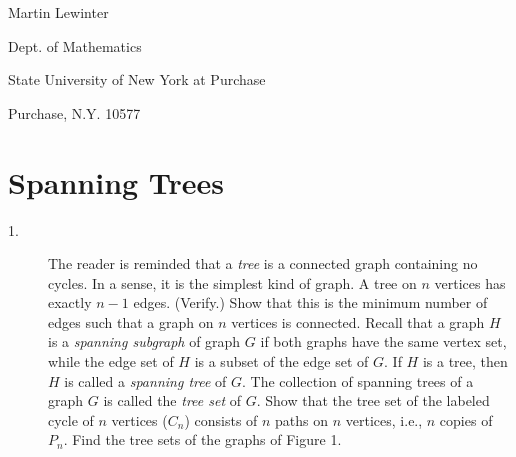\documentclass{article}
\begin{document}
\begin{flushright}
Martin Lewinter

Dept. of Mathematics

State University of New York at Purchase

Purchase, N.Y. 10577
\end{flushright}


\newpage


\section{Spanning Trees}


\begin{description}

\item[1.] The reader is reminded that a \emph{tree} is a connected graph containing no cycles. In a sense, it is the simplest kind of graph. A tree on $n$ vertices has exactly $n-1$ edges. (Verify.) Show that this is the minimum number of edges such that a graph on $n$ vertices is connected. Recall that a graph $H$ is a \emph{spanning subgraph} of graph $G$ if both graphs have the same vertex set, while the edge set of $H$ is a subset of the edge set of $G$. If $H$ is a tree, then $H$ is called a \emph{spanning tree} of $G$. The collection of spanning trees of a graph $G$ is called the \emph{tree set} of $G$. Show that the tree set of the labeled cycle of $n$ vertices ($C_n$) consists of $n$ paths on $n$ vertices, i.e., $n$ copies of $P_n$. Find the tree sets of the graphs of Figure 1.


\end{description}
\end{document}
